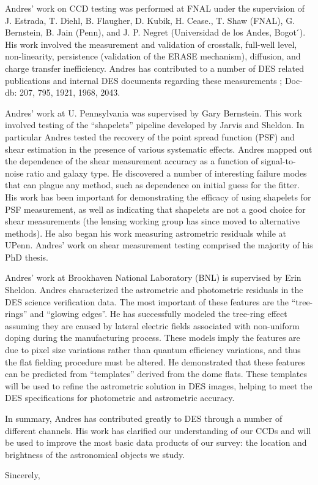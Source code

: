 \documentclass[12pt]{letter}
\begin{document}
\begin{letter}{}
Andres' work on CCD testing was performed at FNAL under the supervision of J.
Estrada, T. Diehl, B. Flaugher, D. Kubik, H. Cease., T. Shaw (FNAL), G.
Bernstein, B. Jain (Penn), and J. P. Negret (Universidad de los Andes, Bogot ́).
His work involved the measurement and validation of crosstalk, full-well level,
non-linearity, persistence (validation of the ERASE mechanism), diffusion, and
charge transfer inefficiency.  Andres has contributed to a number of DES
related publications and internal DES documents regarding these measurements
\cite{Diehl2008,Flaugher2010,Flaugher2012}; Doc-db: 207, 795, 1921, 1968, 2043.

Andres' work at U. Pennsylvania was supervised by Gary Bernstein.  This work
involved testing of the ``shapelets'' pipeline developed by Jarvis and Sheldon.
In particular Andres tested the recovery of the point spread function (PSF) and
shear estimation in the presence of various systematic effects.  Andres mapped
out the dependence of the shear measurement accuracy as a function of
signal-to-noise ratio and galaxy type.  He discovered a number of interesting
failure modes that can plague any method, such as dependence on initial guess
for the fitter. His work has been important for demonstrating the efficacy of
using shapelets for PSF measurement, as well as indicating that shapelets are
not a good choice for shear measurements (the lensing working group has since
moved to alternative methods).  He also began his work measuring astrometric
residuals while at UPenn.  Andres' work on shear measurement testing
comprised the majority of his PhD thesis.

Andres' work at Brookhaven National Laboratory (BNL) is supervised by Erin
Sheldon.  Andres characterized the astrometric and photometric residuals in the
DES science verification data. The most important of these features are the
``tree-rings'' and ``glowing edges''. He has successfully modeled the tree-ring
effect assuming they are caused by lateral electric fields associated with
non-uniform doping during the manufacturing
process\cite{PlazasProceedings2014,Plazas2014}.  These models imply the
features are due to pixel size variations rather than quantum efficiency
variations, and thus the flat fielding procedure must be altered.  He
demonstrated that these features can be predicted from ``templates'' derived
from the dome flats.  These templates will be used to refine the astrometric
solution in DES images, helping to meet the DES specifications for photometric
and astrometric accuracy.

In summary, Andres has contributed greatly to DES through a number of different
channels.  His work has clarified our understanding of our CCDs and will be
used to improve the most basic data products of our survey:  the location and
brightness of the astronomical objects we study.

\closing{Sincerely, }






\end{letter}
\end{document}
